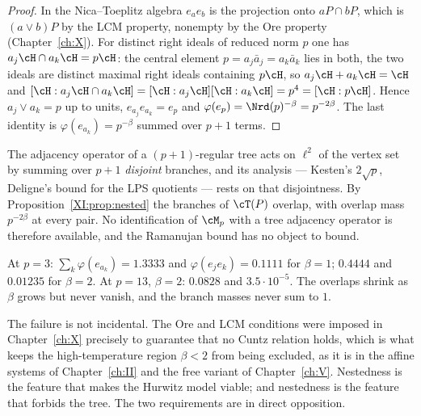 \begin{proof}
In the Nica--Toeplitz algebra $e_ae_b$ is the projection onto $aP\cap bP$, which is
$(a\vee b)P$ by the LCM property, nonempty by the Ore property (Chapter~\ref{ch:X}). For distinct right
ideals of reduced norm $p$ one has $a_j\cH\cap a_k\cH=p\cH$: the central element
$p=a_j\bar a_j=a_k\bar a_k$ lies in both, the two ideals are distinct maximal right ideals
containing $p\cH$, so $a_j\cH+a_k\cH=\cH$ and $[\cH:a_j\cH\cap a_k\cH]=[\cH:a_j\cH][\cH:a_k\cH]=p^4=[\cH:p\cH]$.
Hence $a_j\vee a_k=p$ up to units, $e_{a_j}e_{a_k}=e_p$ and $\varphi(e_p)=\Nrd(p)^{-\beta}=p^{-2\beta}$.
The last identity is $\varphi(e_{a_k})=p^{-\beta}$ summed over $p+1$ terms.
\end{proof}

\begin{corollary}\label{XI:cor:notree}
The adjacency operator of a $(p+1)$-regular tree acts on $\ell^2$ of the vertex set by summing
over $p+1$ \emph{disjoint} branches, and its analysis --- Kesten's $2\sqrt p$, Deligne's
bound for the LPS quotients --- rests on that disjointness. By
Proposition~\ref{XI:prop:nested} the branches of $\cT(P)$ overlap, with overlap mass
$p^{-2\beta}$ at every pair. No identification of $\cM_p$ with a tree adjacency operator is
therefore available, and the Ramanujan bound has no object to bound.
\end{corollary}

\begin{remark}\label{XI:rem:num1}
At $p=3$: $\sum_k\varphi(e_{a_k})=1.3333$ and $\varphi(e_je_k)=0.1111$ for $\beta=1$;
$0.4444$ and $0.01235$ for $\beta=2$. At $p=13$, $\beta=2$: $0.0828$ and $3.5\cdot10^{-5}$.
The overlaps shrink as $\beta$ grows but never vanish, and the branch masses never sum to $1$.
\end{remark}

\begin{remark}\label{XI:rem:tension}
The failure is not incidental. The Ore and LCM conditions were imposed in Chapter~\ref{ch:X} precisely
to guarantee that no Cuntz relation holds, which is what keeps the high-temperature region
$\beta<2$ from being excluded, as it is in the affine systems of Chapter~\ref{ch:II} and the free
variant of Chapter~\ref{ch:V}. Nestedness is the feature that makes the Hurwitz model viable; and
nestedness is the feature that forbids the tree. The two requirements are in direct
opposition.
\end{remark}

